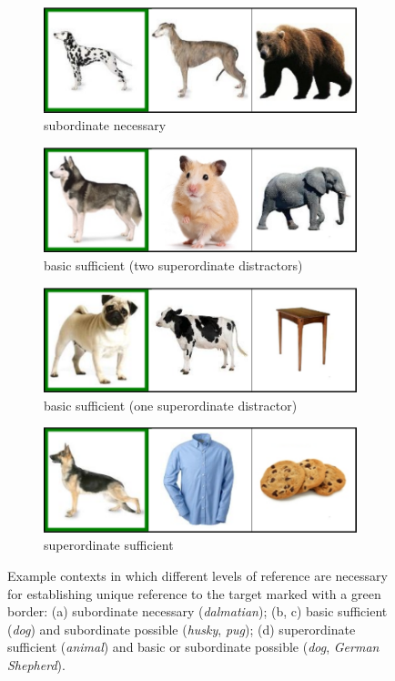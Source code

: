 \documentclass[11pt]{article}
\begin{document}
\begin{figure}
	\begin{subfigure}{.5\textwidth}
		\centering
		\includegraphics[width=.8\textwidth]{pics/item12.pdf}
		\caption{subordinate necessary}
		\label{fig:item12}
	\end{subfigure}
	\begin{subfigure}{.5\textwidth}
		\centering
		\includegraphics[width=.8\textwidth]{pics/item22.pdf}
		\centering
		\caption{basic sufficient (two superordinate distractors)}
		\label{fig:item22}
	\end{subfigure}
	\begin{subfigure}{.5\textwidth}
		\centering
		\includegraphics[width=.8\textwidth]{pics/item23.pdf}
		\caption{basic sufficient (one superordinate distractor)}
		\label{fig:item23}
	\end{subfigure}
	\begin{subfigure}{.5\textwidth}
		\centering
		\includegraphics[width=.8\textwidth]{pics/item33.pdf}
		\centering
		\caption{superordinate sufficient}
		\label{fig:item33}
	\end{subfigure}
	\caption{Example contexts in which different levels of reference are necessary for establishing unique reference to the target marked with a green border: (a) subordinate necessary (\emph{dalmatian}); (b, c) basic sufficient (\emph{dog}) and subordinate possible (\emph{husky}, \emph{pug}); (d) superordinate sufficient (\emph{animal}) and basic or subordinate possible (\emph{dog}, \emph{German Shepherd}).}
	\label{fig:dogcontexts}
\end{figure}
\end{document}
